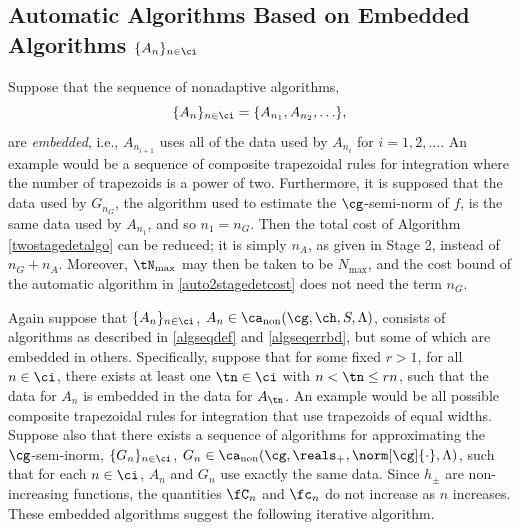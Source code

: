 \documentclass[]{elsarticle}
\DeclareMathOperator{\fix}{non}
\theoremstyle{definition}
\theoremstyle{remark}
\begin{document}
\subsection{Automatic Algorithms Based on Embedded Algorithms $\{A_n\}_{n \in \ci}$}

Suppose that the sequence of nonadaptive algorithms, 
\[
\{A_n\}_{n \in \ci} = \{A_{n_1}, A_{n_2}, \ldots \}, 
\]
are \emph{embedded}, i.e., $A_{n_{i+1}}$ uses all of the data used by $A_{n_{i}}$ for $i=1, 2, \ldots$.  An example would be a sequence of composite trapezoidal rules for integration where the number of trapezoids is a power of two. Furthermore, it is supposed that the data used by $G_{n_G}$, the algorithm used to estimate the $\cg$-semi-norm of $f$, is the same data used by $A_{n_1}$, and so $n_1=n_G$.  Then the total cost of Algorithm \ref{twostagedetalgo} can be reduced; it is simply $n_A$, as given in Stage 2, instead of $n_G+n_A$.  Moreover, $\tN_{\max}$ may then be taken to be $N_{\max}$, and the cost bound of the automatic algorithm in \eqref{auto2stagedetcost} does not need the term $n_G$.

Again suppose that $\{A_n\}_{n \in \ci}$, $A_n  \in \ca_{\fix}(\cg,\ch,S,\Lambda)$, consists of algorithms as described in  \eqref{algseqdef} and \eqref{algseqerrbd}, but some of which are embedded in others.  Specifically, suppose that for some fixed $r > 1$, for all $n \in \ci$, there exists at least one $\tn \in \ci$ with $n < \tn \le rn$, such that the data for $A_n$ is embedded in the data for $A_{\tn}$.  An example would be all possible composite trapezoidal rules for integration that use trapezoids of equal widths. Suppose also that there exists a sequence of algorithms for approximating the $\cg$-sem-inorm, $\{G_n\}_{n \in \ci}$, $G_n  \in \ca_{\fix}(\cg,\reals_+,\norm[\cg]{\cdot},\Lambda)$, such that for each $n \in \ci$, $A_n$ and $G_n$ use exactly the same data.
Since $h_{\pm}$ are non-increasing functions, the quantities $\fC_{n}$ and $\fc_n$ do not increase as $n$ increases. These embedded algorithms suggest the following iterative algorithm.
\end{document}
